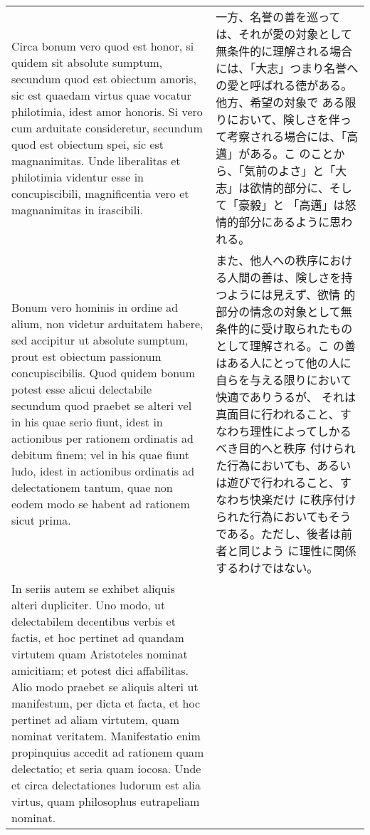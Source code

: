 \documentclass[10pt]{jsarticle}
\begin{document}
\begin{longtable}{p{21em}p{21em}}
 Circa bonum vero quod est honor, si quidem sit absolute sumptum,
 secundum quod est obiectum amoris, sic est quaedam virtus quae
 vocatur philotimia, idest amor honoris. Si vero cum arduitate
 consideretur, secundum quod est obiectum spei, sic est
 magnanimitas. Unde liberalitas et philotimia videntur esse in
 concupiscibili, magnificentia vero et magnanimitas in irascibili.

&

一方、名誉の善を巡っては、それが愛の対象として無条件的に理解される場合
には、「大志」つまり名誉への愛と呼ばれる徳がある。他方、希望の対象で
ある限りにおいて、険しさを伴って考察される場合には、「高邁」がある。こ
のことから、「気前のよさ」と「大志」は欲情的部分に、そして「豪毅」と
「高邁」は怒情的部分にあるように思われる。
  
\\

 Bonum vero hominis in ordine ad alium, non videtur arduitatem habere,
 sed accipitur ut absolute sumptum, prout est obiectum passionum
 concupiscibilis. Quod quidem bonum potest esse alicui delectabile
 secundum quod praebet se alteri vel in his quae serio fiunt, idest in
 actionibus per rationem ordinatis ad debitum finem; vel in his quae
 fiunt ludo, idest in actionibus ordinatis ad delectationem tantum,
 quae non eodem modo se habent ad rationem sicut prima.

&

また、他人への秩序における人間の善は、険しさを持つようには見えず、欲情
的部分の情念の対象として無条件的に受け取られたものとして理解される。こ
の善はある人にとって他の人に自らを与える限りにおいて快適でありうるが、
それは真面目に行われること、すなわち理性によってしかるべき目的へと秩序
付けられた行為においても、あるいは遊びで行われること、すなわち快楽だけ
に秩序付けられた行為においてもそうである。ただし、後者は前者と同じよう
に理性に関係するわけではない。
 
\\


 In seriis autem se exhibet aliquis alteri dupliciter. Uno modo, ut
 delectabilem decentibus verbis et factis, et hoc pertinet ad quandam
 virtutem quam Aristoteles nominat amicitiam; et potest dici
 affabilitas. Alio modo praebet se aliquis alteri ut manifestum, per
 dicta et facta, et hoc pertinet ad aliam virtutem, quam nominat
 veritatem. Manifestatio enim propinquius accedit ad rationem quam
 delectatio; et seria quam iocosa. Unde et circa delectationes ludorum
 est alia virtus, quam philosophus eutrapeliam nominat.



\end{longtable}
\end{document}
